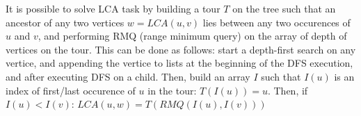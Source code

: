 It is possible to solve LCA task by building a tour $T$ on the tree such that an ancestor of any two vertices $w = LCA(u, v)$ lies between any two occurences of $u$ and $v$, and performing RMQ (range minimum query) on the array of depth of vertices on the tour. This can be done as follows: start a depth-first search on any vertice, and appending the vertice to lists at the beginning of the DFS execution, and after executing DFS on a child. Then, build an array $I$ such that $I(u)$ is an index of first/last occurence of $u$ in the tour: $T(I(u)) = u$. Then, if $I(u) < I(v)$: $LCA(u, w) = T(RMQ(I(u), I(v)))$


